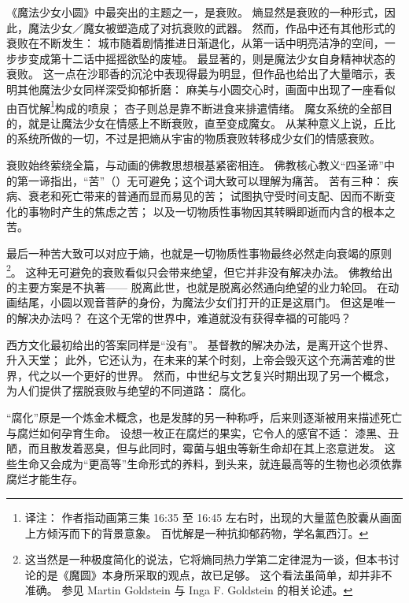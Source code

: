 
《魔法少女小圆》中最突出的主题之一，是衰败。
熵显然是衰败的一种形式，因此，魔法少女／魔女被塑造成了对抗衰败的武器。
然而，作品中还有其他形式的衰败在不断发生：
城市随着剧情推进日渐退化，从第一话中明亮洁净的空间，一步步变成第十二话中摇摇欲坠的废墟。
最显著的，则是魔法少女自身精神状态的衰败。
这一点在沙耶香的沉沦中表现得最为明显，但作品也给出了大量暗示，表明其他魔法少女同样深受抑郁折磨：
麻美与小圆交心时，画面中出现了一座看似由百忧解\footnote{%
    译注：
    作者指动画第三集 16:35 至 16:45 左右时，出现的大量蓝色胶囊从画面上方倾泻而下的背景意象。
    百忧解是一种抗抑郁药物，学名氟西汀。

}构成的喷泉；
杏子则总是靠不断进食来排遣情绪。
魔女系统的全部目的，就是让魔法少女在情感上不断衰败，直至变成魔女。
从某种意义上说，丘比的系统所做的一切，不过是把熵从宇宙的物质衰败转移成少女们的情感衰败。

衰败始终萦绕全篇，与动画的佛教思想根基紧密相连。
佛教核心教义“四圣谛”中的第一谛指出，“苦”（）无可避免；这个词大致可以理解为痛苦。
苦有三种：
疾病、衰老和死亡带来的普通而显而易见的苦；
试图执守受时间支配、因而不断变化的事物时产生的焦虑之苦；
以及一切物质性事物因其转瞬即逝而内含的根本之苦\cite{smart1998buddhism}。

最后一种苦大致可以对应于熵，也就是一切物质性事物最终必然走向衰竭的原则\footnote{%
    这当然是一种极度简化的说法，它将熵同热力学第二定律混为一谈，但本书讨论的是《魔圆》本身所采取的观点，故已足够。
    这个看法虽简单，却并非不准确。
    参见 Martin Goldstein 与 Inga F. Goldstein 的相关论述\cite{goldstein1993refrigerator-universe}。
}。
这种无可避免的衰败看似只会带来绝望，但它并非没有解决办法。
佛教给出的主要方案是不执著——
脱离此世，也就是脱离必然通向绝望的业力轮回\cite{smart1998ingredients-indian-religion}。
在动画结尾，小圆以观音菩萨的身份，为魔法少女们打开的正是这扇门。
但这是唯一的解决办法吗？
在这个无常的世界中，难道就没有获得幸福的可能吗？

西方文化最初给出的答案同样是“没有”。
基督教的解决办法，是离开这个世界、升入天堂；
此外，它还认为，在未来的某个时刻，上帝会毁灭这个充满苦难的世界，代之以一个更好的世界。
然而，中世纪与文艺复兴时期出现了另一个概念，为人们提供了摆脱衰败与绝望的不同道路：
腐化。

“腐化”原是一个炼金术概念，也是发酵的另一种称呼，后来则逐渐被用来描述死亡与腐烂如何孕育生命\cite{paracelsus2003nature-things}。
设想一枚正在腐烂的果实，它令人的感官不适：
漆黑、丑陋，而且散发着恶臭，但与此同时，霉菌与蛆虫等新生命却在其上恣意迸发。
这些生命又会成为“更高等”生命形式的养料，到头来，就连最高等的生物也必须依靠腐烂才能生存。

